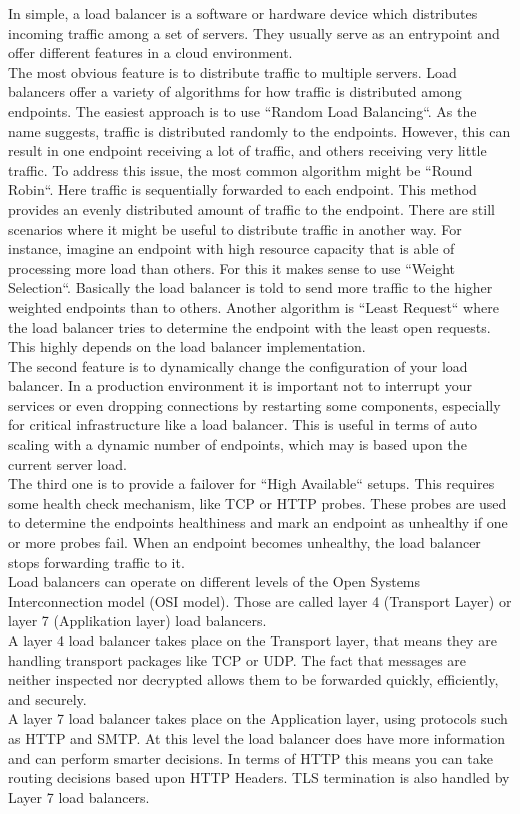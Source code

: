In simple, a load balancer is a software or hardware device which distributes incoming traffic among a set of servers.
They usually serve as an entrypoint and offer different features in a cloud environment.
\\
The most obvious feature is to distribute traffic to multiple servers.
Load balancers offer a variety of algorithms for how traffic is distributed among endpoints.
The easiest approach is to use ``Random Load Balancing``.
As the name suggests, traffic is distributed randomly to the endpoints.
However, this can result in one endpoint receiving a lot of traffic, and others receiving very little traffic.
To address this issue, the most common algorithm might be ``Round Robin``.
Here traffic is sequentially forwarded to each endpoint.
This method provides an evenly distributed amount of traffic to the endpoint.
There are still scenarios where it might be useful to distribute traffic in another way.
For instance, imagine an endpoint with high resource capacity that is able of processing more load than others.
For this it makes sense to use ``Weight Selection``.
Basically the load balancer is told to send more traffic to the higher weighted endpoints than to others.
Another algorithm is ``Least Request`` where the load balancer tries to determine the endpoint with the least open requests.
This highly depends on the load balancer implementation.
\\
The second feature is to dynamically change the configuration of your load balancer.
In a production environment it is important not to interrupt your services or even dropping connections by restarting some components, especially for critical infrastructure like a load balancer.
This is useful in terms of auto scaling with a dynamic number of endpoints, which may is based upon the current server load.
\\
The third one is to provide a failover for ``High Available`` setups.
This requires some health check mechanism, like TCP or HTTP probes.
These probes are used to determine the endpoints healthiness and mark an endpoint as unhealthy if one or more probes fail.
When an endpoint becomes unhealthy, the load balancer stops forwarding traffic to it.
\\
Load balancers can operate on different levels of the Open Systems Interconnection model (OSI model).
Those are called layer 4 (Transport Layer) or layer 7 (Applikation layer) load balancers.
\\
A layer 4 load balancer takes place on the Transport layer, that means they are handling transport packages like TCP or UDP.
The fact that messages are neither inspected nor decrypted allows them to be forwarded quickly, efficiently, and securely.
\\
A layer 7 load balancer takes place on the Application layer, using protocols such as HTTP and SMTP.
At this level the load balancer does have more information and can perform smarter decisions.
In terms of HTTP this means you can take routing decisions based upon HTTP Headers.
TLS termination is also handled by Layer 7 load balancers.

